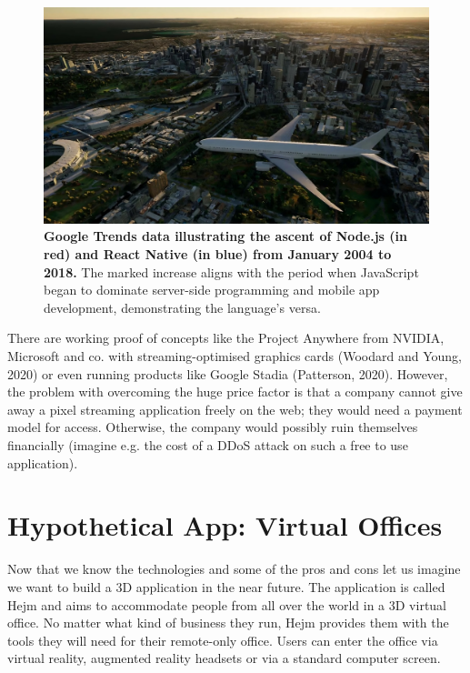 \documentclass[10pt]{article}
\begin{document}
\begin{sloppypar}
  \begin{figure}[ht]
    \centering
    \includegraphics[width=\textwidth]{figures/project-anywhere.jpg}
    \caption[Google Trends data illustrating the ascent of Node.js and React Native.]{\textbf{Google Trends data illustrating the ascent of Node.js (in red) and React Native (in blue) from January 2004 to 2018.} The marked increase aligns with the period when JavaScript began to dominate server-side programming and mobile app development, demonstrating the language's versa.}
    \label{fig:project-anywhere}
  \end{figure}

  There are working proof of concepts like the Project Anywhere from NVIDIA, Microsoft and co. with streaming-optimised graphics cards (Woodard and Young, 2020) or even running products like Google Stadia (Patterson, 2020). However, the problem with overcoming the huge price factor is that a company cannot give away a pixel streaming application freely on the web; they would need a payment model for access. Otherwise, the company would possibly ruin themselves financially (imagine e.g. the cost of a DDoS attack on such a free to use application).

  \section{Hypothetical App: Virtual Offices}
  \label{sec:hypothetical-app-virtual-offices}

  Now that we know the technologies and some of the pros and cons let us imagine we want to build a 3D application in the near future. The application is called Hejm and aims to accommodate people from all over the world in a 3D virtual office. No matter what kind of business they run, Hejm provides them with the tools they will need for their remote-only office. Users can enter the office via virtual reality, augmented reality headsets or via a standard computer screen.


\end{sloppypar}
\end{document}
